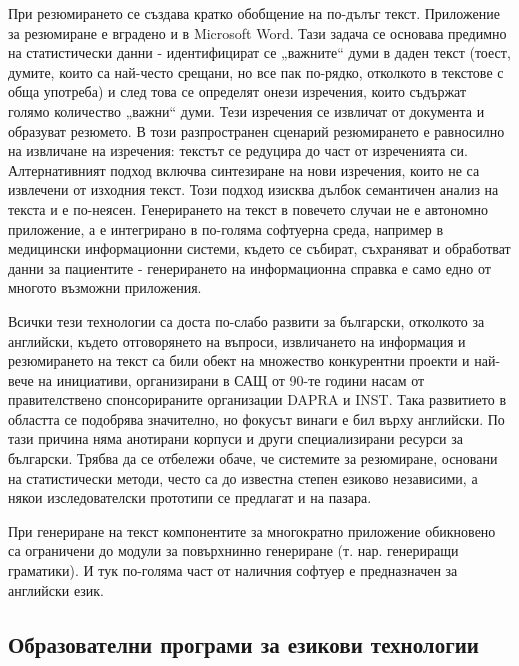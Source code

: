 \documentclass[]{../../metanetpaper}
\begin{document}
\begin{multicols}{2}
При резюмирането се създава кратко обобщение на по-дълъг текст. Приложение за резюмиране е вградено и в Microsoft Word. Тази задача се основава предимно на статистически данни - идентифицират се „важните“ думи в даден текст (тоест, думите, които са най-често срещани, но все
 пак по-рядко, отколкото в текстове с обща употреба) и
 след това се определят онези изречения, които съдържат
 голямо количество „важни“ думи. Тези изречения се извличат от документа и образуват резюмето. В този разпространен сценарий резюмирането е равносилно на извличане на изречения: текстът се редуцира до част от изреченията си.
 Алтернативният подход включва синтезиране на нови
 изречения, които не са извлечени от изходния текст. Този подход изисква дълбок семантичен анализ на текста и е по-неясен. Генерирането на текст в повечето случаи не е автономно приложение, а е интегрирано в по-голяма софтуерна среда, например в медицински информационни системи, където се събират, съхраняват и обработват данни за пациентите - генерирането на информационна справка е само едно от многото възможни приложения.
 

Всички тези технологии са доста по-слабо развити за български, отколкото за английски, където отговорянето на въпроси, извличането на информация
 и резюмирането на текст са били обект на множество конкурентни проекти и най-вече на инициативи, организирани в САЩ от 90-те години насам от правителствено спонсорираните организации DAPRA и INST. Така развитието в областта се подобрява значително, но фокусът винаги е бил върху английски. По тази причина няма анотирани корпуси и други специализирани ресурси за български. Трябва да се отбележи обаче, че системите за резюмиране, основани на статистически методи, често са до известна степен езиково независими, а някои изследователски прототипи се предлагат и на пазара.

При генериране на текст компонентите за многократно приложение обикновено са
 ограничени до модули за повърхнинно генериране (т. нар. генериращи граматики). И тук по-голяма част от наличния софтуер е предназначен за английски език.

\subsection{Образователни програми за езикови технологии}


\end{multicols}
\end{document}
